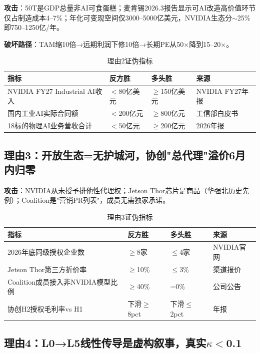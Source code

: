 \textbf{攻击}：50T是GDP总量非AI可食蛋糕；麦肯锡2026.3报告显示可AI改造高价值环节仅占制造成本4--7\%；年化可变现空间仅3000--5000亿美元，NVIDIA生态分$\sim$25\%即750--1250亿/年。

\textbf{破坏路径}：TAM缩10倍→远期利润下修10倍→长期PE从50$\times$降到15--20$\times$。

\begin{table}[H]
\centering\scriptsize
\renewcommand{\arraystretch}{1.1}
\begin{tabularx}{\textwidth}{l X X l}
\toprule
\textbf{指标} & \textbf{反方胜} & \textbf{多头胜} & \textbf{来源} \\
\midrule
NVIDIA FY27 Industrial AI收入 & $<$80亿美元 & $\geq$150亿美元 & NVIDIA FY27年报 \\
国内工业AI实际合同额 & $<$200亿元 & $\geq$800亿元 & 工信部白皮书 \\
18标的物理AI业务营收合计 & $<$50亿元 & $\geq$200亿元 & 2026年报 \\
\bottomrule
\end{tabularx}
\caption{理由2证伪指标}
\end{table}

\subsection{理由3：开放生态=无护城河，协创"总代理"溢价6月内归零}

\textbf{攻击}：NVIDIA从未授予排他性代理权；Jetson Thor芯片是商品（华强北历史先例）；Coalition是"营销PR列表"，成员无需独家承诺。

\begin{table}[H]
\centering\scriptsize
\renewcommand{\arraystretch}{1.1}
\begin{tabularx}{\textwidth}{l X X l}
\toprule
\textbf{指标} & \textbf{反方胜} & \textbf{多头胜} & \textbf{来源} \\
\midrule
2026年底同级授权企业数 & $\geq$8家 & $\leq$4家 & NVIDIA官网 \\
Jetson Thor第三方折价率 & $\geq$10\% & $\leq$3\% & 渠道报价 \\
Coalition成员接入非NVIDIA模型比例 & $\geq$40\% & =0\% & 公司公告 \\
协创H2授权毛利率vs H1 & 下滑$\geq$8pct & 下滑$\leq$2pct & 年报 \\
\bottomrule
\end{tabularx}
\caption{理由3证伪指标}
\end{table}

\subsection{理由4：L0→L5线性传导是虚构叙事，真实$\kappa<$0.1}

